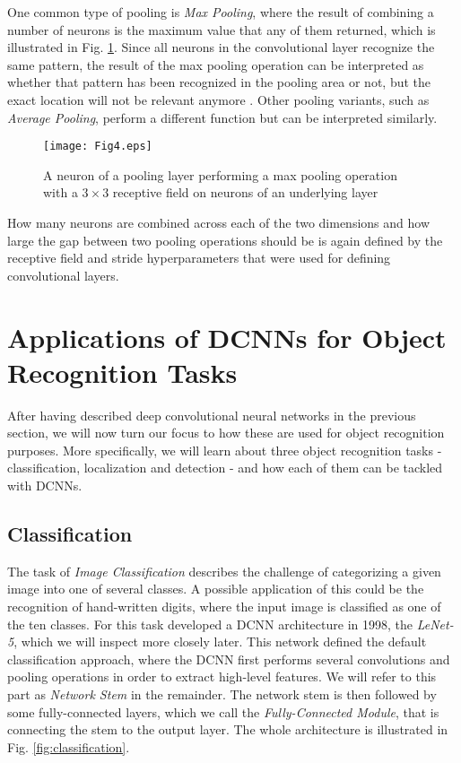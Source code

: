\documentclass[conference]{IEEEtran}
\begin{document}
One common type of pooling is \emph{Max Pooling}, where the result of combining a number of neurons is the maximum value that any of them returned, which is illustrated in Fig. \ref{fig:pooling}. Since all neurons in the convolutional layer recognize the same pattern, the result of the max pooling operation can be interpreted as whether that pattern has been recognized in the pooling area or not, but the exact location will not be relevant anymore \cite{NNDLbook}. Other pooling variants, such as \emph{Average Pooling}, perform a different function but can be interpreted similarly.

\begin{figure}
\texttt{[image: Fig4.eps]}
\caption{A neuron of a pooling layer performing a max pooling operation with a $3 \times 3$ receptive field on neurons of an underlying layer}
\label{fig:pooling}
\end{figure}

How many neurons are combined across each of the two dimensions and how large the gap between two pooling operations should be is again defined by the receptive field and stride hyperparameters that were used for defining convolutional layers.



\section{Applications of DCNNs for Object Recognition Tasks}\label{sec:applications}
After having described deep convolutional neural networks in the previous section, we will now turn our focus to how these are used for object recognition purposes. More specifically, we will learn about three object recognition tasks - classification, localization and detection - and how each of them can be tackled with DCNNs.


\subsection{Classification}\label{subsec:classification}
The task of \emph{Image Classification} describes the challenge of categorizing a given image into one of several classes. A possible application of this could be the recognition of hand-written digits, where the input image is classified as one of the ten classes. For this task \cite{LeNet5} developed a DCNN architecture in 1998, the \emph{LeNet-5}, which we will inspect more closely later. This network defined the default classification approach, where the DCNN first performs several convolutions and pooling operations in order to extract high-level features. We will refer to this part as \emph{Network Stem} in the remainder. The network stem is then followed by some fully-connected layers, which we call the \emph{Fully-Connected Module}, that is connecting the stem to the output layer. The whole architecture is illustrated in Fig. \ref{fig:classification}.
\end{document}
